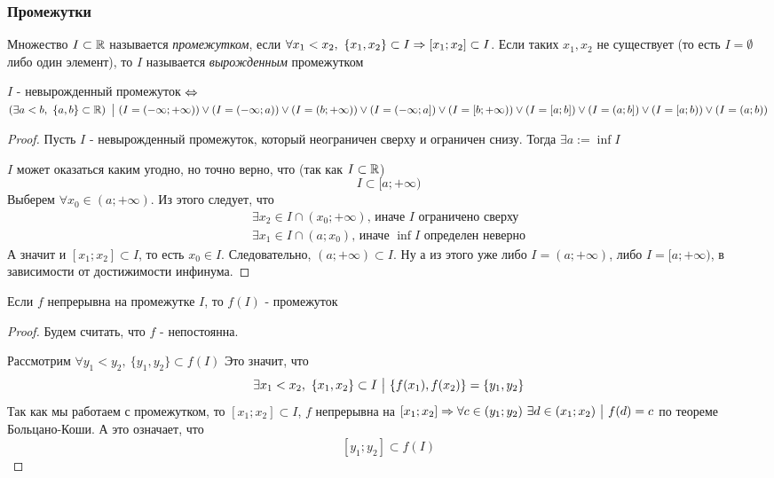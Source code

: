 \subsubsection*{Промежутки}

\begin{definition}
	Множество $I \subset \mathbb{R}$ называется \textit{промежутком}, если $\forall x_1 < x_2,\ \{x_1, x_2\} \subset I \Rightarrow [x_1; x_2] \subset I$. Если таких $x_1, x_2$ не существует (то есть $I = \emptyset$ либо один элемент), то $I$ называется \textit{вырожденным} промежутком
\end{definition}

\begin{lemma}
	$I$ - невырожденный промежуток $\Leftrightarrow$ $\left(\exists a < b,\ \{a, b\} \subset \mathbb{R}\right) \ \big|\  (I = (-\infty; +\infty)) \vee (I = (-\infty; a)) \vee (I = (b; +\infty)) \vee (I = (-\infty; a]) \vee (I = [b; +\infty)) \vee (I = [a; b]) \vee (I = (a; b]) \vee (I = [a; b)) \vee (I = (a; b))$
\end{lemma}

\begin{proof}
	Пусть $I$ - невырожденный промежуток, который неограничен сверху и ограничен снизу. Тогда $\exists a := \inf I$
	
	$I$ может оказаться каким угодно, но точно верно, что (так как $I \subset \mathbb{R}$)
	$$
		I \subset [a; +\infty)
	$$
	Выберем $\forall x_0 \in (a; +\infty)$. Из этого следует, что
	\begin{align*}
		\exists x_2 \in I \cap (x_0; +\infty) \text{, иначе } I \text{ ограничено сверху}
		\\
		\exists x_1 \in I \cap (a; x_0) \text{, иначе } \inf I \text{ определен неверно}
	\end{align*}
	А значит и $[x_1; x_2] \subset I$, то есть $x_0 \in I$. Следовательно,
	$(a;+\infty) \subset I$. Ну а из этого уже либо $I = (a; +\infty)$, либо $I = [a; +\infty)$, в зависимости от достижимости инфинума.
\end{proof}

\begin{lemma}
	Если $f$ непрерывна на промежутке $I$, то $f(I)$ - промежуток
\end{lemma}

\begin{proof}
	Будем считать, что $f$ - непостоянна.
	
	Рассмотрим $\forall y_1 < y_2,\ \{y_1, y_2\} \subset f(I)$
	Это значит, что
	$$
		\exists x_1 < x_2,\ \{x_1, x_2\} \subset I \such \{f(x_1), f(x_2)\} = \{y_1, y_2\}
	$$
	Так как мы работаем с промежутком, то $[x_1; x_2] \subset I$, $f$ непрерывна на $[x_1; x_2] \Rightarrow \forall c \in (y_1; y_2)\ \exists d \in (x_1; x_2) \ \big|\  f(d) = c$ по теореме Больцано-Коши. А это означает, что
	$$
		[y_1; y_2] \subset f(I)
	$$
\end{proof}

